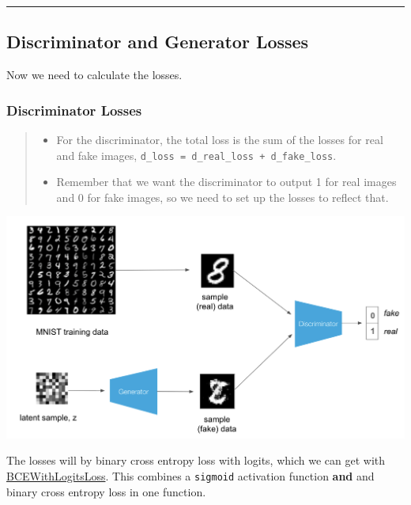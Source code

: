 \begin{center}\rule{0.5\linewidth}{0.5pt}\end{center}

\subsection{Discriminator and Generator
Losses}\label{discriminator-and-generator-losses}

Now we need to calculate the losses.

\subsubsection{Discriminator Losses}\label{discriminator-losses}

\begin{quote}
\begin{itemize}
\item For the discriminator, the total loss is the sum of the losses for
  real and fake images,
  \lstinline{d_loss = d_real_loss + d_fake_loss}.
\item  Remember that we want the discriminator to output 1 for real images
  and 0 for fake images, so we need to set up the losses to reflect
  that.
\end{itemize}
\end{quote}

\includegraphics[width=1\linewidth]{img//genAdvNet//gan/part2_screengrab.png}

The losses will by binary cross entropy loss with logits, which we can
get with
\href{https://pytorch.org/docs/stable/nn.html\#bcewithlogitsloss}{BCEWithLogitsLoss}.
This combines a \lstinline{sigmoid} activation function
\textbf{and} and binary cross entropy loss in one function.\newline

